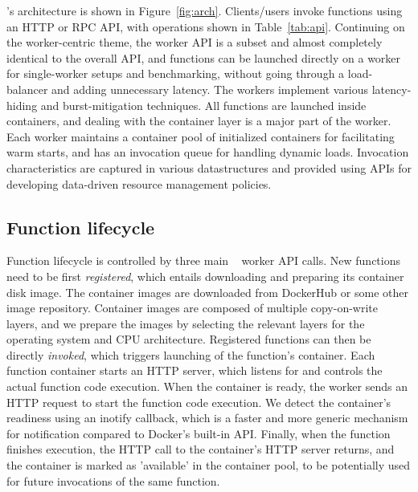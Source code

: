 \sysname's architecture is shown in Figure~\ref{fig:arch}.
Clients/users invoke functions using an HTTP or RPC API, with operations shown in Table~\ref{tab:api}. 
Continuing on the worker-centric theme, the worker API is a subset and almost completely identical to the overall API, and functions can be launched directly on a worker for single-worker setups and benchmarking, without going through a load-balancer and adding unnecessary latency.
The workers implement various latency-hiding and burst-mitigation techniques. 
All functions are launched inside containers, and dealing with the container layer is a major part of the worker. 
Each worker maintains a container pool of initialized containers for facilitating warm starts, and has an invocation queue for handling dynamic loads.
Invocation characteristics are captured in various datastructures and provided using APIs for developing data-driven resource management policies. 




\subsection{Function lifecycle}

Function lifecycle is controlled by three main \sysname~ worker API calls.
New functions need to be first \emph{registered}, which entails downloading and preparing its container disk image.
The container images are downloaded from DockerHub or some other image repository.
Container images are composed of multiple copy-on-write layers, and we prepare the images by selecting the relevant layers for the operating system and CPU architecture.
%
Registered functions can then be directly \emph{invoked}, which triggers launching of the function's container. 
Each function container starts an HTTP server, which listens for and controls the actual function code execution.
When the container is ready, the worker sends an HTTP request to start the function code execution.
We detect the container's readiness using an inotify callback, which is a faster and more generic mechanism for notification compared to Docker's built-in API. 
%
Finally, when the function finishes execution, the HTTP call to the container's HTTP server returns, and the container is marked as  'available' in the container pool, to be potentially used for future invocations of the same function.


